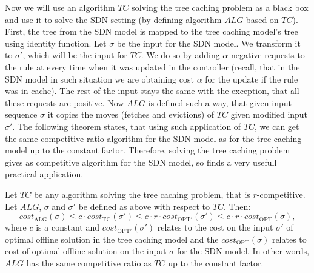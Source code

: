 Now we will use an algorithm $TC$ solving the tree caching problem as a black
box and use it to solve the SDN setting (by defining algorithm $ALG$ based on
$TC$). First, the tree from the SDN model is mapped to the tree caching model's
tree using identity function. Let $\sigma$ be the input for the SDN model. We
transform it to $\sigma'$, which will be the input for $TC$. We do so by adding
$\alpha$ negative requests to the rule at every time when it was updated in the
controller (recall, that in the SDN model in such situation we are obtaining
cost $\alpha$ for the update if the rule was in cache). The rest of the input
stays the same with the exception, that all these requests are positive. Now
$ALG$ is defined such a way, that given input sequence $\sigma$ it copies the
moves (fetches and evictions) of $TC$ given modified input $\sigma'$. The
following theorem states, that using such application of $TC$, we can get the
same competitive ratio algorithm for the SDN model as for the tree caching model
up to the constant factor. Therefore, solving the tree caching problem gives as
competitive algorithm for the SDN model, so finds a very usefull practical
application.  
\begin{theorem} 
Let $TC$ be any algorithm solving the tree caching
problem, that is $r$-competitive. Let $ALG$, $\sigma$ and $\sigma'$ be defined
as above with respect to $TC$. Then: $$cost_{\mathrm{ALG}}(\sigma) \leq c \cdot
cost_{\mathrm{TC}}(\sigma') \leq c \cdot r \cdot cost_{\mathrm{OPT'}}(\sigma')
\leq c \cdot r \cdot cost_{\mathrm{OPT}}(\sigma),$$ where $c$ is a constant and
$cost_{\mathrm{OPT'}}(\sigma')$ relates to the cost on the input $\sigma'$ of
optimal offline solution in the tree caching model and the
$cost_{\mathrm{OPT}}(\sigma)$ relates to cost of optimal offline solution on the
input $\sigma$ for the SDN model. In other words, $ALG$ has the same competitive
ratio
as $TC$ up to the constant factor. 
\end{theorem} 
